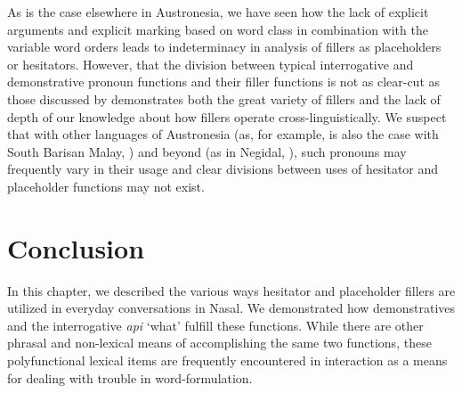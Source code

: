\documentclass[output=paper,colorlinks,citecolor=brown
\ChapterDOI{10.5281/zenodo.15697585}
]{langscibook}
\begin{document}
As is the case elsewhere in Austronesia, we have seen how the lack of explicit arguments and explicit marking based on word class in combination with the variable word orders leads to indeterminacy in analysis of fillers as placeholders or hesitators. However, that the division between typical interrogative and demonstrative pronoun functions and their filler functions is not as clear-cut as those discussed by \textcite{hayashi2010crosslinguistic} demonstrates both the great variety of fillers and the lack of depth of our knowledge about how fillers operate cross-linguistically. We suspect that with other languages of Austronesia (as, for example, is also the case with South Barisan Malay, \cite{chapters/mcdonnell_billings}) and beyond (as in Negidal, \cite{chapters/pakendorf}), such pronouns may frequently vary in their usage and clear divisions between uses of hesitator and placeholder functions may not exist.

\newpage
\section{Conclusion}\label{sec:Conclusion}

In this chapter, we described the various ways hesitator and placeholder fillers are utilized in everyday conversations in Nasal. We demonstrated how demonstratives and the interrogative \textit{api} `what' fulfill these functions. While there are other phrasal and non-lexical means of accomplishing the same two functions, these polyfunctional lexical items are frequently encountered in interaction as a means for dealing with trouble in word-formulation. 

\label{app:coding}
\end{document}
